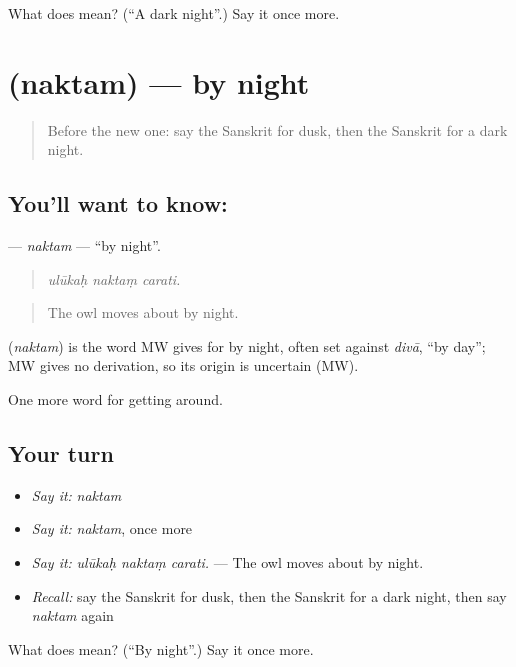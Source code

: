\begin{tcolorbox}[breakable,colback=teal!4,colframe=teal!35!black,title={Before you move on}]
What does  mean? (\textquotedblleft{}A dark night\textquotedblright{}.) Say it once more.
\end{tcolorbox}
\section[\texorpdfstring{\sk{नक्तम्} (naktam)}{नक्तम् (naktam)}]{ (naktam) — by night}

\label{lesson:SA-C443-naktam}



\begin{quote}
Before the new one: say the Sanskrit for dusk, then the Sanskrit for a dark night.
\end{quote}

\subsection*{You'll want to know: }
\textbf{} — \emph{naktam} — \textquotedblleft{}by night\textquotedblright{}.

\begin{quote}
  
\end{quote}

\begin{quote}
\emph{ulūkaḥ naktaṃ carati.}
\end{quote}

\begin{quote}
The owl moves about by night.
\end{quote}

\begin{cousinweb}
\textbf{} (\emph{naktam}) is the word MW gives for by night, often set against \emph{divā}, \textquotedblleft{}by day\textquotedblright{}; MW gives no derivation, so its origin is uncertain (MW).
\end{cousinweb}

\begin{grammarlens}[title={What you've built}]
One more word for getting around.
\end{grammarlens}

\subsection*{Your turn}
\begin{itemize}
\raggedright
  \item \emph{Say it:} \emph{naktam}
  \item \emph{Say it:} \emph{naktam}, once more
  \item \emph{Say it:} \emph{ulūkaḥ naktaṃ carati.} — The owl moves about by night.
  \item \emph{Recall:} say the Sanskrit for dusk, then the Sanskrit for a dark night, then say \emph{naktam} again
\end{itemize}

\begin{tcolorbox}[breakable,colback=teal!4,colframe=teal!35!black,title={Before you move on}]
What does  mean? (\textquotedblleft{}By night\textquotedblright{}.) Say it once more.
\end{tcolorbox}
